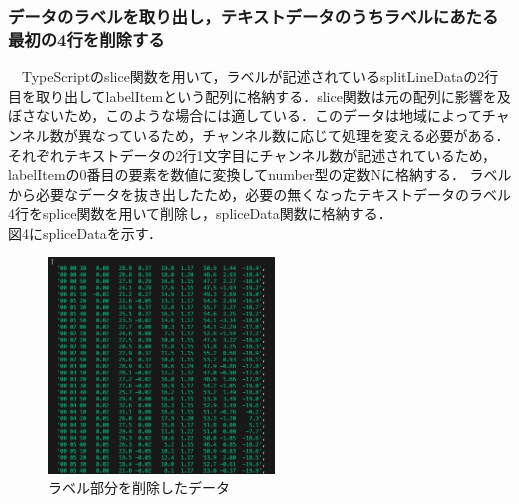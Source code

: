  \subsubsection{データのラベルを取り出し，テキストデータのうちラベルにあたる最初の4行を削除する}
　TypeScriptのslice関数を用いて，ラベルが記述されているsplitLineDataの2行目を取り出してlabelItemという配列に格納する．slice関数は元の配列に影響を及ぼさないため，このような場合には適している．\cite{mdn_slice}このデータは地域によってチャンネル数が異なっているため，チャンネル数に応じて処理を変える必要がある．それぞれテキストデータの2行1文字目にチャンネル数が記述されているため，labelItemの0番目の要素を数値に変換してnumber型の定数Nに格納する．
 ラベルから必要なデータを抜き出したため，必要の無くなったテキストデータのラベル4行をsplice関数を用いて削除し，spliceData関数に格納する．\\
 図4にspliceDataを示す．\\
 \begin{figure}[h]
   \centering
   \caption{ラベル部分を削除したデータ}
   \includegraphics[width=60mm]{fig/spliceData.png}
 \end{figure}
 
